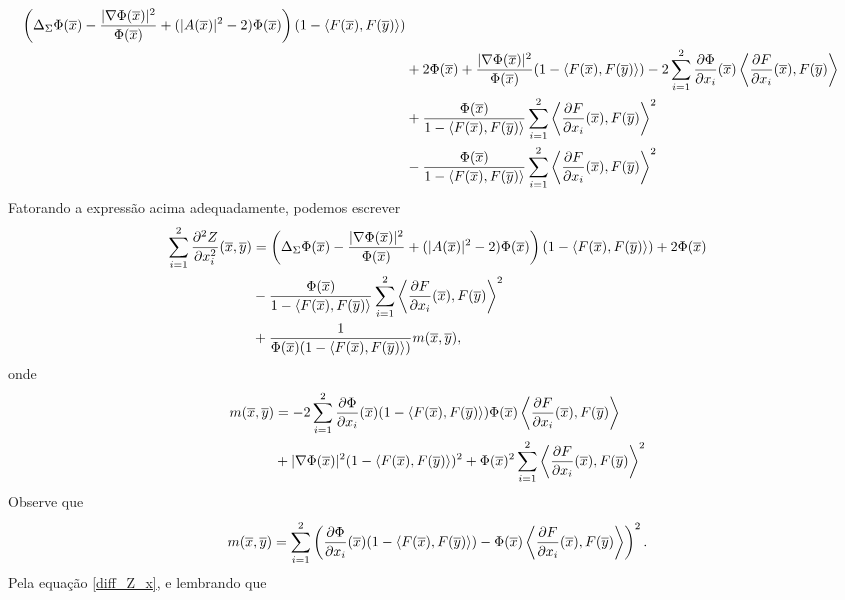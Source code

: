 \begin{demonstracao}
\begin{eqnarray*}
\begin{aligned}
\left(\Delta_{\Sigma} \Phi(\overline{x}) - \frac{|\nabla \Phi(\overline{x})|^2}{\Phi(\overline{x})} + (|A(\overline{x})|^2 - 2)\Phi(\overline{x})\right)(1 - \langle F(\overline{x}), F(\overline{y}) \rangle) \\
&+ 2 \Phi(\overline{x}) + \frac{|\nabla \Phi(\overline{x})|^2}{\Phi(\overline{x})} (1 - \langle F(\overline{x}), F(\overline{y}) \rangle) - 2 \sum_{i=1}^2 \frac{\partial \Phi}{\partial x_i}(\overline{x}) \left\langle \frac{\partial F}{\partial x_i}(\overline{x}), F(\overline{y}) \right\rangle \\
&+ \frac{\Phi(\overline{x})}{1 - \langle F(\overline{x}),F(\overline{y}) \rangle} \sum_{i=1}^2 \left\langle \frac{\partial F}{\partial x_i} (\overline{x}), F(\overline{y}) \right\rangle^2 \\
& - \frac{\Phi(\overline{x})}{1 - \langle F(\overline{x}),F(\overline{y}) \rangle} \sum_{i=1}^2
\left\langle \frac{\partial F}{\partial x_i} (\overline{x}), F(\overline{y}) \right\rangle^2
\end{aligned}
\end{eqnarray*}
Fatorando a express\~ao acima adequadamente, podemos escrever
\begin{eqnarray*}
\begin{aligned}
\sum_{i=1}^2 \frac{\partial^2 Z}{\partial x_i^2}(\overline{x},\overline{y}) &= \left(\Delta_{\Sigma} \Phi(\overline{x}) - \frac{|\nabla \Phi(\overline{x})|^2}{\Phi(\overline{x})} + (|A(\overline{x})|^2 - 2)\Phi(\overline{x})\right)(1 - \langle F(\overline{x}), F(\overline{y}) \rangle)+ 2 \Phi(\overline{x})	\\
& - \frac{\Phi(\overline{x})}{1 - \langle F(\overline{x}),F(\overline{y}) \rangle} \sum_{i=1}^2 \left\langle \frac{\partial F}{\partial x_i} (\overline{x}), F(\overline{y}) \right\rangle^2 \\
& + \frac{1}{\Phi(\overline{x})(1 - \langle F(\overline{x}), F(\overline{y}) \rangle)}m(\overline{x},\overline{y}),
\end{aligned}
\end{eqnarray*}	
onde
\begin{eqnarray*}
\begin{aligned}
m(\overline{x},\overline{y}) &= - 2 \sum_{i=1}^2 \frac{\partial \Phi}{\partial x_i}(\overline{x}) 
(1 - \langle F(\overline{x}), F(\overline{y}) \rangle) \Phi(\overline{x}) \left\langle \frac{\partial F}
{\partial x_i}(\overline{x}), F(\overline{y}) \right\rangle \\
&+ |\nabla \Phi(\overline{x})|^2 (1 - \langle F(\overline{x}), F(\overline{y}) \rangle)^2 
 + \Phi(\overline{x})^2 \sum_{i=1}^2 \left\langle \frac{\partial F}
 {\partial x_i} (\overline{x}), F(\overline{y}) \right\rangle^2
\end{aligned}
\end{eqnarray*}	
Observe que
\[
m(\overline{x},\overline{y}) = \sum_{i=1}^2 \left(  \frac{\partial \Phi}{\partial x_i}(\overline{x})
(1 - \langle F(\overline{x}),F(\overline{y}) \rangle) - \Phi(\overline{x}) \left\langle 
\frac{\partial F}{\partial x_i}(\overline{x}), F(\overline{y}) \right\rangle \right)^2.
\]
Pela equação \eqref{diff_Z_x}, e lembrando que 

\end{demonstracao}
